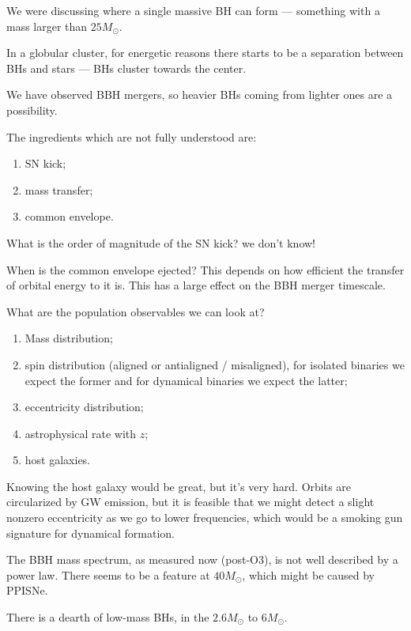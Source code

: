 \documentclass[main.tex]{subfiles}
\begin{document}

We were discussing where a single massive BH can form --- something with a mass larger than \(25M_{\odot}\). 

In a globular cluster, for energetic reasons there starts to be a separation between BHs and stars --- BHs cluster towards the center. 

We have observed BBH mergers, so heavier BHs coming from lighter ones are a possibility. 

The ingredients which are not fully understood are: 
\begin{enumerate}
    \item SN kick;
    \item mass transfer;
    \item common envelope.
\end{enumerate}

What is the order of magnitude of the SN kick? we don't know! 

When is the common envelope ejected? This depends on how efficient the transfer of orbital energy to it is. This has a large effect on the BBH merger timescale. 

What are the population observables we can look at?
\begin{enumerate}
    \item Mass distribution;
    \item spin distribution (aligned or antialigned / misaligned), for isolated binaries we expect the former and for dynamical binaries we expect the latter;
    \item eccentricity distribution;
    \item astrophysical rate with \(z\);
    \item host galaxies.
\end{enumerate}

Knowing the host galaxy would be great, but it's very hard. 
Orbits are circularized by GW emission, but it is feasible that we might detect a slight nonzero eccentricity as we go to lower frequencies, which 
would be a smoking gun signature for dynamical formation.

The BBH mass spectrum, as measured now (post-O3), is not well described
by a power law. 
There seems to be a feature at \(40M_{\odot}\), which might be caused by PPISNe. 

There is a dearth of low-mass BHs, in the \(2.6M_{\odot}\) to \(6M_{\odot}\). 
\end{document}
